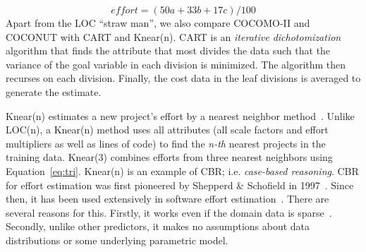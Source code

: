 \documentclass{sig-alternate}
\begin{document}
{\footnotesize
\begin{equation}\label{eq:tri}
\mathit{effort} = (50a + 33b + 17c)/100
\end{equation}}
Apart from the LOC ``straw man'',
we also compare COCOMO-II and COCONUT with CART
and Knear(n). 
CART is an {\em iterative dichotomization} algorithm
that finds the attribute that most divides the data such that
the variance of the goal variable in each division is minimized.
The algorithm then recurses on each division. 
Finally, the cost data in the leaf divisions
is averaged to generate the estimate. 

Knear(n) estimates a new project's effort
by a nearest neighbor  method~\cite{shepperd97}. Unlike LOC(n),
a Knear(n) method uses all attributes
(all scale factors and effort multipliers as well as lines of code)
to find the {\em n-th} nearest projects in the training data. 
Knear(3) combines efforts from three nearest neighbors using
Equation~\ref{eq:tri}.
Knear(n) is an example of CBR; i.e.  {\em case-based reasoning}.
CBR for effort estimation was 
first pioneered by Shepperd \& Schofield
in 1997~\cite{shepperd97}.
  Since then, it 
has been used extensively in software effort
estimation~\cite{Auer2006,Walkerden1999,%
  Kirsopp2002,shepperd97,kadoda00,Li2008,Li2006,Li2007,Li2009a,
  keung2008a,keung2008b,keung2008c}.  
There are several reasons  for this. Firstly, 
it works even if the domain data is sparse~\cite{Myrtveit}.
Secondly, 
unlike other predictors, it makes no assumptions about data
distributions or some  underlying parametric model. 
\end{document}
